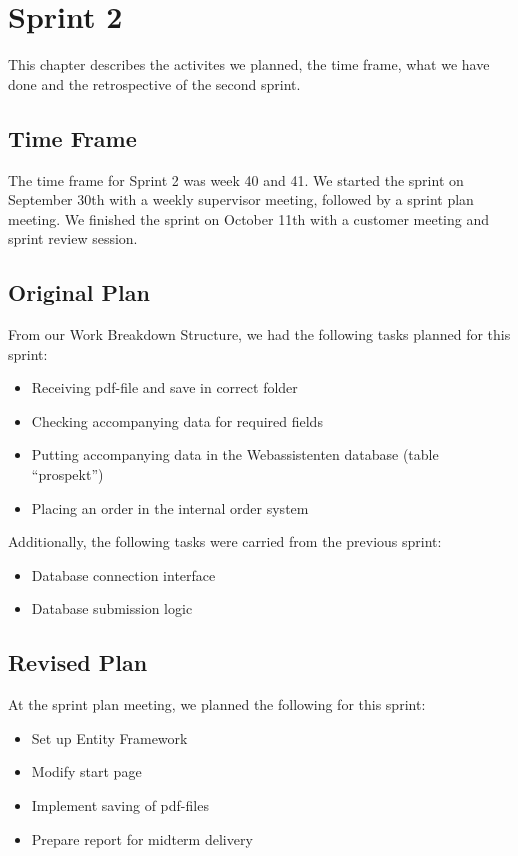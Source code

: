 \chapter{Sprint 2}
This chapter describes the activites we planned, the time frame, what we have done and the retrospective of the second sprint. 
\newpage 

\section{Time Frame}
The time frame for Sprint 2 was week 40 and 41. We started the sprint on September 30th with a weekly supervisor meeting, followed by a sprint plan meeting. We finished the sprint on October 11th with a customer meeting and sprint review session.

\section{Original Plan}
From our Work Breakdown Structure, we had the following tasks planned for this sprint:
\begin{itemize}
	\item Receiving pdf-file and save in correct folder
	\item Checking accompanying data for required fields
	\item Putting accompanying data in the Webassistenten database (table “prospekt”)
	\item Placing an order in the internal order system
\end{itemize}

Additionally, the following tasks were carried from the previous sprint:
\begin{itemize}
	\item Database connection interface
	\item Database submission logic
\end{itemize}

\section{Revised Plan}
At the sprint plan meeting, we planned the following for this sprint:
\begin{itemize}
	\item Set up Entity Framework
	\item Modify start page
	\item Implement saving of pdf-files
	\item Prepare report for midterm delivery
\end{itemize}

